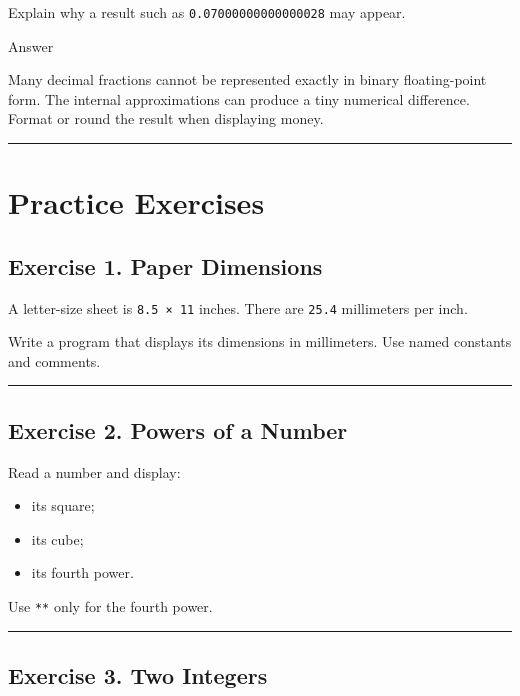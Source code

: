 \documentclass[
]{article}
\providecommand{\tightlist}{%
  \setlength{\itemsep}{0pt}\setlength{\parskip}{0pt}}
\begin{document}
Explain why a result such as \texttt{0.07000000000000028} may appear.

Answer

Many decimal fractions cannot be represented exactly in binary
floating-point form. The internal approximations can produce a tiny
numerical difference. Format or round the result when displaying money.

\begin{center}\rule{0.5\linewidth}{0.5pt}\end{center}

\section{Practice Exercises}\label{practice-exercises}

\subsection{Exercise 1. Paper
Dimensions}\label{exercise-1.-paper-dimensions}

A letter-size sheet is \texttt{8.5\ ×\ 11} inches. There are
\texttt{25.4} millimeters per inch.

Write a program that displays its dimensions in millimeters. Use named
constants and comments.

\begin{center}\rule{0.5\linewidth}{0.5pt}\end{center}

\subsection{Exercise 2. Powers of a
Number}\label{exercise-2.-powers-of-a-number}

Read a number and display:

\begin{itemize}
\tightlist
\item
  its square;
\item
  its cube;
\item
  its fourth power.
\end{itemize}

Use \texttt{**} only for the fourth power.

\begin{center}\rule{0.5\linewidth}{0.5pt}\end{center}

\subsection{Exercise 3. Two Integers}\label{exercise-3.-two-integers}
\end{document}
